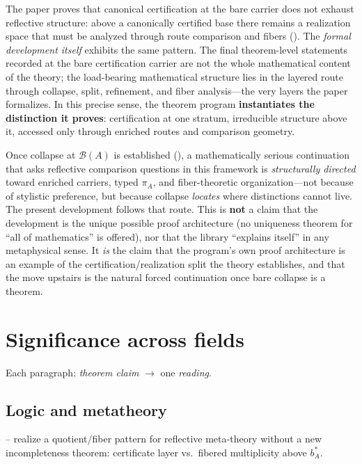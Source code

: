 \documentclass[11pt]{article}
\begin{document}
The paper proves that canonical certification at the bare carrier does not exhaust reflective structure: above a canonically certified base there remains a realization space that must be analyzed through route comparison and fibers (). The \emph{formal development itself} exhibits the same pattern. The final theorem-level statements recorded at the bare certification carrier are not the whole mathematical content of the theory; the load-bearing mathematical structure lies in the layered route through collapse, split, refinement, and fiber analysis---the very layers the paper formalizes. In this precise sense, the theorem program \textbf{instantiates the distinction it proves}: certification at one stratum, irreducible structure above it, accessed only through enriched routes and comparison geometry.

Once collapse at $\mathcal{B}(A)$ is established (), a mathematically serious continuation that asks reflective comparison questions in this framework is \emph{structurally directed} toward enriched carriers, typed $\pi_A$, and fiber-theoretic organization---not because of stylistic preference, but because collapse \emph{locates} where distinctions cannot live. The present development follows that route. This is \textbf{not} a claim that the development is the unique possible proof architecture (no uniqueness theorem for ``all of mathematics'' is offered), nor that the library ``explains itself'' in any metaphysical sense. It \emph{is} the claim that the program's own proof architecture is an example of the certification/realization split the theory establishes, and that the move upstairs is the natural forced continuation once bare collapse is a theorem.

\section{Significance across fields}\label{sec:significance}

Each paragraph: \emph{theorem claim} $\to$ one \emph{reading}.

\subsection{Logic and metatheory}\label{sec:significance-logic}
-- realize a quotient/fiber pattern for reflective meta-theory without a new incompleteness theorem: certificate layer vs.\ fibered multiplicity above $b^\ast_A$.
\end{document}
